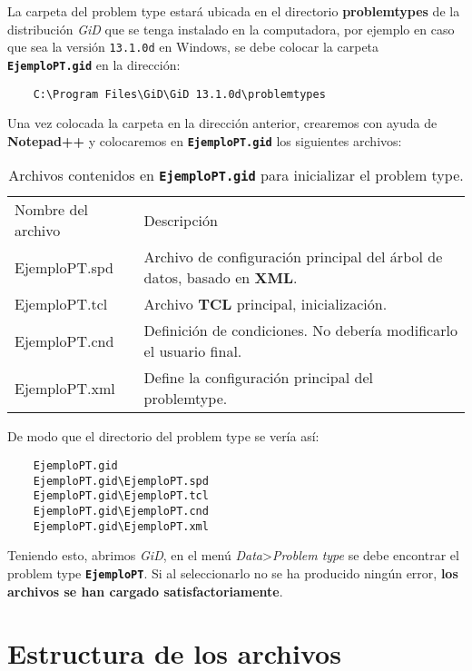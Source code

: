 \documentclass[10pt, a4paper, twocolumn]{article} %
\begin{document}
La carpeta del problem type estará ubicada en el directorio \textbf{problemtypes} de la distribución \textit{GiD} que se tenga instalado en la computadora, por ejemplo en caso que sea la versión \texttt{13.1.0d} en Windows, se debe colocar la carpeta \textbf{\texttt{EjemploPT.gid}} en la dirección:

\begin{verbatim}
	C:\Program Files\GiD\GiD 13.1.0d\problemtypes
\end{verbatim}

Una vez colocada la carpeta en la dirección anterior, crearemos con ayuda de \textbf{Notepad++} y colocaremos en \textbf{\texttt{EjemploPT.gid}} los siguientes archivos:

\begin{table}[hbtp!]
	\label{tab:estructuraArchivos}
	\begin{tabular}{l m{4.5cm}}
		\rowcolor{BlueGiD!60} Nombre del archivo & Descripción\\
		\rowcolor{BlueGiD!20} EjemploPT.spd & Archivo de configuración principal del árbol de datos, basado en \textbf{XML}.\\
		EjemploPT.tcl & Archivo \textbf{TCL} principal, inicialización.\\
		\rowcolor{BlueGiD!20} EjemploPT.cnd & Definición de condiciones. No debería modificarlo el usuario final.\\
		EjemploPT.xml & Define la configuración principal del problemtype.\\
	\end{tabular}
	\caption{Archivos contenidos en \textbf{\texttt{EjemploPT.gid}} para inicializar el problem type.}
\end{table}

De modo que el directorio del problem type se vería así:

\begin{verbatim}
	EjemploPT.gid
	EjemploPT.gid\EjemploPT.spd
	EjemploPT.gid\EjemploPT.tcl
	EjemploPT.gid\EjemploPT.cnd
	EjemploPT.gid\EjemploPT.xml
\end{verbatim}

Teniendo esto, abrimos \textit{GiD}, en el menú \textit{Data}>\textit{Problem type} se debe encontrar el problem type \textbf{\texttt{EjemploPT}}. Si al seleccionarlo no se ha producido ningún error, \textbf{los archivos se han cargado satisfactoriamente}.

\section{Estructura de los archivos}
\end{document}

